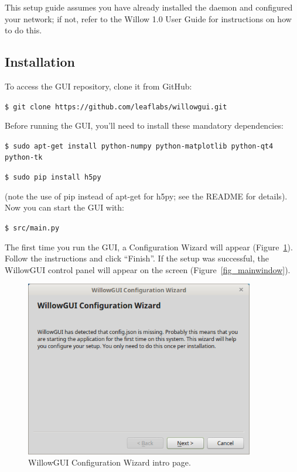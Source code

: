 This setup guide assumes you have already installed the daemon and configured your network; if not, refer to the Willow 1.0 User Guide for instructions on how to do this.

\subsection{Installation}
\label{sec_setup_obtaining}

\noindent
To access the GUI repository, clone it from GitHub:

\vspace{5mm}
\texttt{\$ git clone https://github.com/leaflabs/willowgui.git}
\vspace{5mm}

\noindent
Before running the GUI, you'll need to install these mandatory dependencies:

\vspace{5mm}
\texttt{\$ sudo apt-get install python-numpy python-matplotlib python-qt4 python-tk}

\texttt{\$ sudo pip install h5py}
\vspace{5mm}

\noindent
(note the use of pip instead of apt-get for h5py; see the README for details). Now you can start the GUI with:

\vspace{5mm}
\texttt{\$ src/main.py}
\vspace{5mm}

\noindent
The first time you run the GUI, a Configuration Wizard will appear (Figure~\ref{fig_wizard}). Follow the instructions and click ``Finish''. If the setup was successful, the WillowGUI control panel will appear on the screen (Figure~\ref{fig_mainwindow}).

\begin{figure}[h!]
\begin{center}
\includegraphics[width=10cm]{screenshots/configWizard.png}
\end{center}
\caption{WillowGUI Configuration Wizard intro page.}
\label{fig_wizard}
\end{figure}

